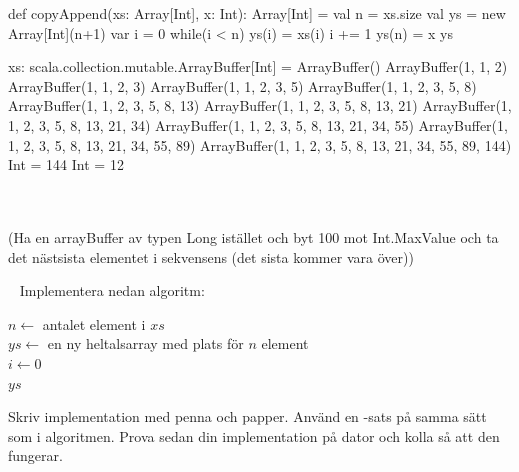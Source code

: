 \SOLUTION


\TaskSolved \what


\SubtaskSolved  \begin{Code}
def copyAppend(xs: Array[Int], x: Int): Array[Int] = {
  val n = xs.size
  val ys = new Array[Int](n+1)
  var i = 0
  while(i < n) {
    ys(i) = xs(i)
    i += 1
  }
  ys(n) = x
  ys
}
\end{Code}

\SubtaskSolved  \begin{REPL}
xs: scala.collection.mutable.ArrayBuffer[Int] = ArrayBuffer()
ArrayBuffer(1, 1, 2)
ArrayBuffer(1, 1, 2, 3)
ArrayBuffer(1, 1, 2, 3, 5)
ArrayBuffer(1, 1, 2, 3, 5, 8)
ArrayBuffer(1, 1, 2, 3, 5, 8, 13)
ArrayBuffer(1, 1, 2, 3, 5, 8, 13, 21)
ArrayBuffer(1, 1, 2, 3, 5, 8, 13, 21, 34)
ArrayBuffer(1, 1, 2, 3, 5, 8, 13, 21, 34, 55)
ArrayBuffer(1, 1, 2, 3, 5, 8, 13, 21, 34, 55, 89)
ArrayBuffer(1, 1, 2, 3, 5, 8, 13, 21, 34, 55, 89, 144)
Int = 144
Int = 12
\end{REPL}

\SubtaskSolved  {}\\
\\
(Ha en arrayBuffer av typen Long istället och byt 100 mot Int.MaxValue och ta det nästsista elementet i sekvensens (det sista kommer vara över))


\QUESTEND








\QUESTBEGIN

\Task  \what~  Implementera nedan algoritm:

\begin{algorithm}[H]

 $n \leftarrow$ antalet element i $xs$ \\
 $ys \leftarrow$ en ny heltalsarray med plats för $n$ element\\
 $i \leftarrow 0$  \\
 \Return $ys$
\end{algorithm}

\Subtask\Pen Skriv implementation med penna och papper. Använd en -sats på samma sätt som i algoritmen. Prova sedan din implementation på dator och kolla så att den fungerar.

